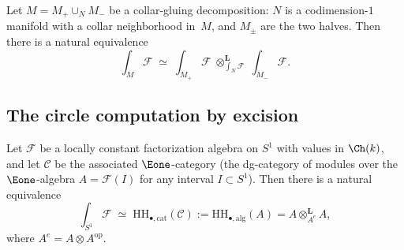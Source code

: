 \begin{theorem}
\label{thm:excision}
Let $M = M_+ \cup_N M_-$ be a collar-gluing decomposition: $N$ is a
codimension-$1$ manifold with a collar neighborhood in~$M$, and
$M_\pm$ are the two halves. Then there is a natural equivalence
\[
\int_M \mathcal{F}
\;\simeq\;
\int_{M_+} \mathcal{F}
\;\otimes^{\mathbf{L}}_{\int_N \mathcal{F}}\;
\int_{M_-} \mathcal{F}.
\]
\end{theorem}

\subsection{The circle computation by excision}

\begin{theorem}[Factorization homology on $S^1$ $=$ algebraic Hochschild chains;
\ClaimStatusProvedHere]
\label{thm:circle-fh-hochschild}
Let $\mathcal{F}$ be a locally constant factorization algebra on
$S^1$ with values in $\Ch(k)$, and let $\mathcal{C}$ be the
associated $\Eone$-category \textup{(}the dg-category of modules
over the $\Eone$-algebra $A = \mathcal{F}(I)$ for any interval
$I \subset S^1$\textup{)}. Then there is a natural equivalence
\begin{equation}\label{eq:circle-fh-HH}
\int_{S^1} \mathcal{F}
\;\simeq\;
\mathrm{HH}_{\bullet,\mathrm{cat}}(\mathcal{C})
:= \mathrm{HH}_{\bullet,\mathrm{alg}}(A)
= A \otimes^{\mathbf{L}}_{A^e} A,
\end{equation}
where $A^e = A \otimes A^{\mathrm{op}}$.
\end{theorem}

